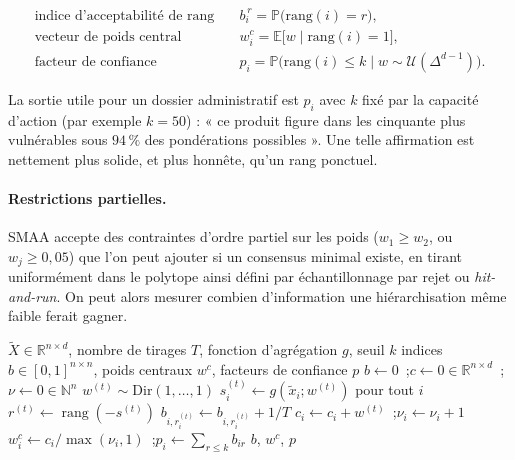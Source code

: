 \documentclass[11pt,a4paper]{article}
\theoremstyle{definition}
\theoremstyle{remark}
\newcommand{\R}{\mathbb{R}}
\newcommand{\N}{\mathbb{N}}
\newcommand{\PP}{\mathbb{P}}
\newcommand{\EE}{\mathbb{E}}
\newcommand{\Unif}{\mathcal{U}}
\newcommand{\simplex}{\Delta^{d-1}}
\begin{document}
\medskip

\begin{align*}
  \text{indice d'acceptabilité de rang} \quad & b^{\,r}_i = \PP\big(\text{rang}(i) = r\big), \\
  \text{vecteur de poids central} \quad & w^{c}_i = \EE\big[w \mid \text{rang}(i) = 1\big], \\
  \text{facteur de confiance} \quad & p_i = \PP\big(\text{rang}(i) \le k \mid w \sim \Unif(\simplex)\big).
\end{align*}

\bigskip

La sortie utile pour un dossier administratif est $p_i$ avec $k$ fixé par la capacité d'action
(par exemple $k=50$) : « ce produit figure dans les cinquante plus vulnérables sous $94\,\%$ des
pondérations possibles ». Une telle affirmation est nettement plus solide, et plus honnête,
qu'un rang ponctuel.

\paragraph{Restrictions partielles.} SMAA accepte des contraintes d'ordre partiel sur les poids
($w_1 \ge w_2$, ou $w_j \ge 0{,}05$) que l'on peut ajouter si un consensus minimal existe, en
tirant uniformément dans le polytope ainsi défini par échantillonnage par rejet ou \emph{hit-and-run}.
On peut alors mesurer combien d'information une hiérarchisation même faible ferait gagner.

\medskip

\begin{algorithm}[htbp]
  \caption{SMAA --- indices d'acceptabilité de rang}
  \label{algo:smaa}
  \begin{algorithmic}[1]
    \Require $\tilde{X}\in\R^{n\times d}$, nombre de tirages $T$, fonction d'agrégation $g$, seuil $k$
    \Ensure indices $b \in [0,1]^{n\times n}$, poids centraux $w^c$, facteurs de confiance $p$
    \State $b \gets 0$~;\quad $c \gets 0 \in \R^{n\times d}$~;\quad $\nu \gets 0 \in \N^n$
      \State $w^{(t)} \sim \mathrm{Dir}(1,\dots,1)$ 
      \State $s^{(t)}_i \gets g(\tilde{x}_i ; w^{(t)})$ pour tout $i$
      \State $r^{(t)} \gets \operatorname{rang}(-s^{(t)})$
        \State $b_{i, r^{(t)}_i} \gets b_{i, r^{(t)}_i} + 1/T$
         $c_i \gets c_i + w^{(t)}$~;\quad $\nu_i \gets \nu_i + 1$
        \EndIf
      \EndFor
    \EndFor
    \State $w^{c}_i \gets c_i / \max(\nu_i, 1)$~;\quad $p_i \gets \sum_{r \le k} b_{i r}$
    \State \Return $b$, $w^c$, $p$
  \end{algorithmic}
\end{algorithm}
\end{document}
